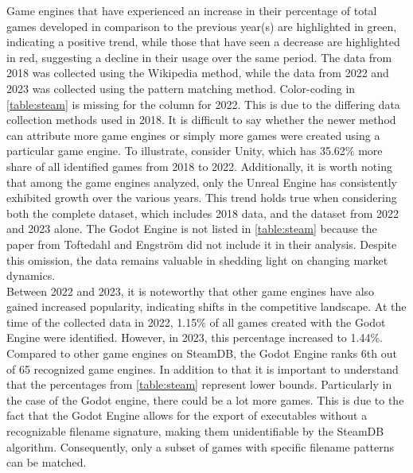 Game engines that have experienced an increase in their percentage of total games developed in comparison to the previous year(s) are highlighted in green, indicating a positive trend, while those that have seen a decrease are highlighted in red, suggesting a decline in their usage over the same period.
The data from 2018 was collected using the Wikipedia method, while the data from 2022 and 2023 was collected using the pattern matching method. 
Color-coding in \autoref{table:steam} is missing for the column for 2022. 
This is due to the differing data collection methods used in 2018.
It is difficult to say whether the newer method can attribute more game engines or simply more games were created using a particular game engine.
To illustrate, consider Unity, which has 35.62\% more share of all identified games from 2018 to 2022.
Additionally, it is worth noting that among the game engines analyzed, only the Unreal Engine has consistently exhibited growth over the various years.
This trend holds true when considering both the complete dataset, which includes 2018 data, and the dataset from 2022 and 2023 alone. 
The Godot Engine is not listed in \autoref{table:steam} because the paper from Toftedahl and Engström did not include it in their analysis.
Despite this omission, the data remains valuable in shedding light on changing market dynamics. \\

Between 2022 and 2023, it is noteworthy that other game engines have also gained increased popularity, indicating shifts in the competitive landscape.
At the time of the collected data in 2022, 1.15\% of all games created with the Godot Engine were identified.
However, in 2023, this percentage increased to 1.44\%.
Compared to other game engines on SteamDB, the Godot Engine ranks 6th out of 65 recognized game engines.
In addition to that it is important to understand that the percentages from \autoref{table:steam} represent lower bounds.
Particularly in the case of the Godot engine, there could be a lot more games.
This is due to the fact that the Godot Engine allows for the export of executables without a recognizable filename signature, making them unidentifiable by the SteamDB algorithm.
Consequently, only a subset of games with specific filename patterns can be matched. \\

